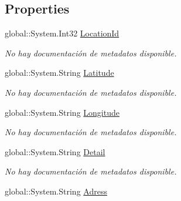 \subsection*{Properties}
\begin{DoxyCompactItemize}
\item 
global\-::\-System.\-Int32 \hyperlink{class_microsoft_1_1_samples_1_1_kinect_1_1_basic_interactions_1_1_locations_afc4d6ef2c39c390bf642a947e2a30edc}{Location\-Id}
\begin{DoxyCompactList}\small\item\em No hay documentación de metadatos disponible. \end{DoxyCompactList}\item 
global\-::\-System.\-String \hyperlink{class_microsoft_1_1_samples_1_1_kinect_1_1_basic_interactions_1_1_locations_ad5ad8fe4891dede31d86b3441b1b7992}{Latitude}
\begin{DoxyCompactList}\small\item\em No hay documentación de metadatos disponible. \end{DoxyCompactList}\item 
global\-::\-System.\-String \hyperlink{class_microsoft_1_1_samples_1_1_kinect_1_1_basic_interactions_1_1_locations_acb562730d1b21d3c9a8116dee8cb2bca}{Longitude}
\begin{DoxyCompactList}\small\item\em No hay documentación de metadatos disponible. \end{DoxyCompactList}\item 
global\-::\-System.\-String \hyperlink{class_microsoft_1_1_samples_1_1_kinect_1_1_basic_interactions_1_1_locations_ad5906857ef62c6a01feb79d52611af0b}{Detail}
\begin{DoxyCompactList}\small\item\em No hay documentación de metadatos disponible. \end{DoxyCompactList}\item 
global\-::\-System.\-String \hyperlink{class_microsoft_1_1_samples_1_1_kinect_1_1_basic_interactions_1_1_locations_a7ad2647b08a20f5afb262244edde6518}{Adress}

\end{DoxyCompactItemize}
